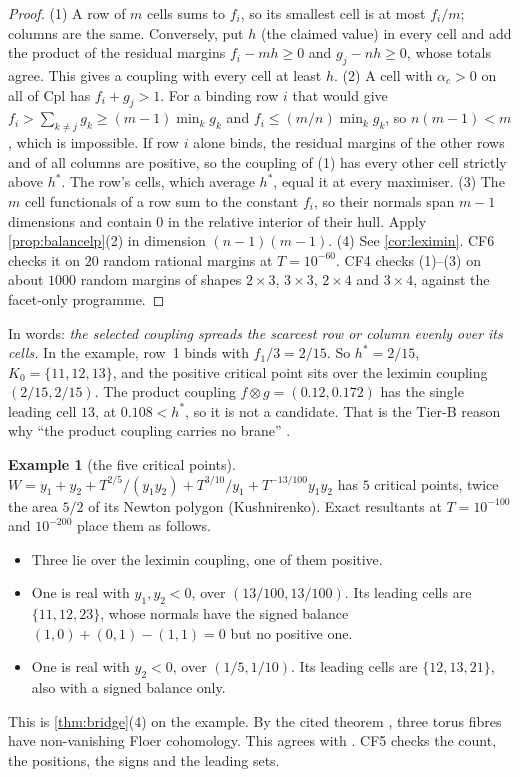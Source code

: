 \documentclass[11pt]{article}
\theoremstyle{definition}\newtheorem{definition}[theorem]{Definition}\newtheorem{remark}[theorem]{Remark}\newtheorem{example}[theorem]{Example}\newtheorem{problem}[theorem]{Open problem}\crefname{problem}{Problem}{Problems}
\begin{document}
\begin{proof}
(1) A row of $m$ cells sums to $f_i$, so its smallest cell is at most $f_i/m$; columns are the same. Conversely, put $h$ (the claimed value) in every cell and add the product of the
residual margins $f_i-mh\ge0$ and $g_j-nh\ge0$, whose totals agree. This gives a coupling with every cell at least $h$. (2) A cell with $\alpha_c>0$ on all of $\mathrm{Cpl}$ has $f_i+g_j>1$. For a
binding row $i$ that would give $f_i>\sum_{k\ne j}g_k\ge(m-1)\min_kg_k$ and $f_i\le(m/n)\min_kg_k$, so $n(m-1)<m$, which is impossible. If row $i$ alone binds, the residual margins of the
other rows and of all columns are positive, so the coupling of (1) has every other cell strictly above $h^*$. The row's cells, which average $h^*$, equal it at every
maximiser. (3) The $m$ cell functionals of a row sum to the constant $f_i$, so their normals span $m-1$ dimensions and contain $0$ in the relative interior of their hull. Apply
\cref{prop:balancelp}(2) in dimension $(n-1)(m-1)$. (4) See \cref{cor:leximin}. CF6 checks it on $20$ random rational margins at $T=10^{-60}$.
CF4 checks (1)--(3) on about $1000$ random margins of shapes $2\times3$, $3\times3$, $2\times4$ and $3\times4$, against the facet-only programme.
\end{proof}

In words: \emph{the selected coupling spreads the scarcest row or column evenly over its cells.} In the example, row~1 binds with $f_1/3=2/15$. So $h^*=2/15$, $K_0=\{11,12,13\}$, and the positive
critical point sits over the leximin coupling $(2/15,2/15)$. The product coupling $f\otimes g=(0.12,0.172)$ has the single leading cell $13$, at $0.108<h^*$, so it is not a candidate. That is
the Tier-B reason why ``the product coupling carries no brane'' \cite{Awasthi2026Br}.

\begin{example}[the five critical points]\label{ex:fivecrit}
$W=y_1+y_2+T^{2/5}/(y_1y_2)+T^{3/10}/y_1+T^{-13/100}y_1y_2$ has $5$ critical points, twice the area $5/2$ of its Newton polygon (Kushnirenko). Exact resultants at $T=10^{-100}$ and $10^{-200}$ place them as follows.
\begin{itemize}[itemsep=1pt]
\item Three lie over the leximin coupling, one of them positive.
\item One is real with $y_1,y_2<0$, over $(13/100,13/100)$. Its leading cells are $\{11,12,23\}$, whose normals have the signed balance $(1,0)+(0,1)-(1,1)=0$ but no positive one.
\item One is real with $y_2<0$, over $(1/5,1/10)$. Its leading cells are $\{12,13,21\}$, also with a signed balance only.
\end{itemize}
This is \cref{thm:bridge}(4) on the example. By the cited theorem \cite{ChoOh2006}, three torus fibres have non-vanishing Floer cohomology. This agrees with \cite[Thm.~8.2]{Awasthi2026Br}. CF5 checks
the count, the positions, the signs and the leading sets.
\end{example}
\end{document}

